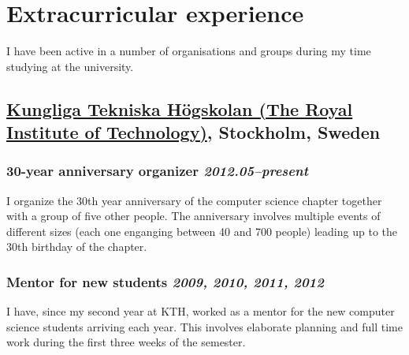 \documentclass[a4paper,11pt]{article}
\newcommand{\icon}[1]{\textcolor{lightgray}{#1}}
\newcommand{\iconl}[1]{\hspace{-0.5cm}\makebox[0.3cm][c]{\icon{#1}}\hspace{0.2cm}}
\newcommand{\worktitle}[1]{\textbf{#1}}
\newcommand{\duration}[1]{\textsl{#1}}
\newcommand{\theplace}[2][]{\subsection*{\textbf{#2}#1}}
\newcommand{\thework}[2]{\subsubsection*{%
  \iconl{$\blacksquare$}%
  \worktitle{#1}%
  \hfill\duration{#2}}\par%
}
\begin{document}
\section*{Extracurricular  experience}%
I have been active in a number of organisations and groups during my time studying at the university.

\theplace[, Stockholm, Sweden]{\href{http://kth.se}{Kungliga Tekniska Högskolan (The Royal Institute of Technology)}}

\thework{30-year anniversary organizer}{2012.05--present}
I organize the 30th year anniversary of the computer science chapter together with a group of five other people. The anniversary involves multiple events of different sizes (each one enganging between 40 and 700 people) leading up to the 30th birthday of the chapter.

\thework{Mentor for new students}{2009, 2010, 2011, 2012}
I have, since my second year at KTH, worked as a mentor for the new computer science students arriving each year. This involves elaborate planning and full time work during the first three weeks of the semester.
\end{document}
